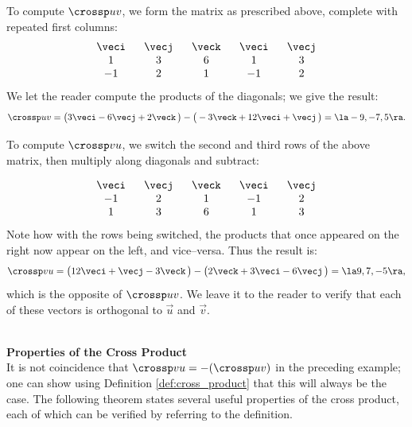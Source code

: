 {To compute $\crossp uv$, we form the matrix as prescribed above, complete with repeated first columns:
$$\begin{array}{ccccc} \ \veci\ &\ \vecj\ &\ \veck\ &\ \veci\ &\ \vecj\ \\  1&3&6&1&3\\-1&2&1&-1&2\end{array}$$
We let the reader compute the products of the diagonals; we give the result:
$$\crossp uv = \big(3\veci-6\vecj+2\veck\,\big) - \big(-3\veck + 12\veci+\vecj\,\big) = \la -9,-7,5\ra.$$

To compute $\crossp vu$, we switch the second and third rows of the above matrix, then multiply along diagonals and subtract:

$$\begin{array}{ccccc} \ \veci\ &\ \vecj\ &\ \veck\ &\ \veci\ &\ \vecj\ \\-1&2&1&-1&2\\  1&3&6&1&3\end{array}$$
Note how with the rows being switched, the products that once appeared on the right now appear on the left, and vice--versa. Thus the result is:
$$\crossp vu = \big(12\veci+\vecj-3\veck\,\big) - \big(2\veck + 3\veci-6\vecj\,\big) = \la 9,7,-5\ra,$$
which is the opposite of $\crossp uv$. We leave it to the reader to verify that each of these vectors is orthogonal to $\vec u$ and $\vec v$.
}\\

\noindent\textbf{\large Properties of the Cross Product}\\

It is not coincidence that $\crossp vu = -(\crossp uv)$ in the preceding example; one can show using Definition \ref{def:cross_product} that this will always be the case. The following theorem states several useful properties of the cross product, each of which can be verified by referring to the definition.

